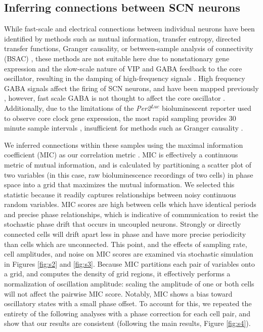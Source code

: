 \subsection*{Inferring connections between SCN neurons}

While fast-scale and electrical connections between individual neurons have been identified by methods such as mutual information, transfer entropy, directed transfer functions, Granger causality, or between-sample analysis of connectivity (BSAC) \cite{Garofalo2009, Bettencourt2007, Kaminski2001, Pourzanjani2015, Freeman2013a}, these methods are not suitable here due to nonstationary gene expression and the slow-scale nature of VIP and GABA feedback to the core oscillator, resulting in the damping of high-frequency signals \cite{Fujita2010, Pourzanjani2015, DeWoskin2015}.
High frequency GABA signals affect the firing of SCN neurons, and have been mapped previously \cite{Freeman2013a}, however, fast scale GABA is not thought to affect the core oscillator \cite{DeWoskin2015}.
Additionally, due to the limitations of the \textit{Per2$^{Luc}$} bioluminescent reporter used to observe core clock gene expression, the most rapid sampling provides 30 minute sample intervals \cite{Evans2013}, insufficient for methods such as Granger causality \cite{Pourzanjani2015}.

We inferred connections within these samples using the maximal information coefficient (MIC) as our correlation metric \cite{Reshef2011}.
MIC is effectively a continuous metric of mutual information, and is calculated by partitioning a scatter plot of two variables (in this case, raw bioluminescence recordings of two cells) in phase space into a grid that maximizes the mutual information.
We selected this statistic because it readily captures relationships between noisy continuous random variables.
MIC scores are high between cells which have identical periods and precise phase relationships, which is indicative of communication to resist the stochastic phase drift that occurs in uncoupled neurons.
Strongly or directly connected cells will drift apart less in phase and have more precise periodicity than cells which are unconnected.
This point, and the effects of sampling rate, cell amplitudes, and noise on MIC scores are examined via stochastic simulation in Figures \ref{fig:s2} and \ref{fig:s3}.
Because MIC partitions each pair of variables onto a grid, and computes the density of grid regions, it effectively performs a normalization of oscillation amplitude: scaling the amplitude of one or both cells will not affect the pairwise MIC score.
Notably, MIC shows a bias toward oscillatory states with a small phase offset.
To account for this, we repeated the entirety of the following analyses with a phase correction for each cell pair, and show that our results are consistent (following the main results, Figure \ref{fig:s4}).


